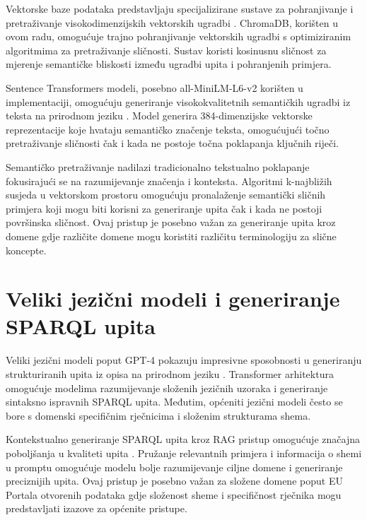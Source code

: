 Vektorske baze podataka predstavljaju specijalizirane sustave za pohranjivanje i pretraživanje visokodimenzijskih vektorskih ugradbi \cite{wang2023vector}. ChromaDB, korišten u ovom radu, omogućuje trajno pohranjivanje vektorskih ugradbi s optimiziranim algoritmima za pretraživanje sličnosti. Sustav koristi kosinusnu sličnost za mjerenje semantičke bliskosti između ugradbi upita i pohranjenih primjera.

Sentence Transformers modeli, posebno all-MiniLM-L6-v2 korišten u implementaciji, omogućuju generiranje visokokvalitetnih semantičkih ugradbi iz teksta na prirodnom jeziku \cite{reimers2019sentence}. Model generira 384-dimenzijske vektorske reprezentacije koje hvataju semantičko značenje teksta, omogućujući točno pretraživanje sličnosti čak i kada ne postoje točna poklapanja ključnih riječi.

Semantičko pretraživanje nadilazi tradicionalno tekstualno poklapanje fokusirajući se na razumijevanje značenja i konteksta. Algoritmi k-najbližih susjeda u vektorskom prostoru omogućuju pronalaženje semantički sličnih primjera koji mogu biti korisni za generiranje upita čak i kada ne postoji površinska sličnost. Ovaj pristup je posebno važan za generiranje upita kroz domene gdje različite domene mogu koristiti različitu terminologiju za slične koncepte.

\section{Veliki jezični modeli i generiranje SPARQL upita}
\label{sec:llm_sparql}

Veliki jezični modeli poput GPT-4 pokazuju impresivne sposobnosti u generiranju strukturiranih upita iz opisa na prirodnom jeziku \cite{brown2020language, devlin2018bert, emonet2024llm}. Transformer arhitektura omogućuje modelima razumijevanje složenih jezičnih uzoraka i generiranje sintaksno ispravnih SPARQL upita. Međutim, općeniti jezični modeli često se bore s domenski specifičnim rječnicima i složenim strukturama shema.

Kontekstualno generiranje SPARQL upita kroz RAG pristup omogućuje značajna poboljšanja u kvaliteti upita \cite{lewis2020retrieval}. Pružanje relevantnih primjera i informacija o shemi u promptu omogućuje modelu bolje razumijevanje ciljne domene i generiranje preciznijih upita. Ovaj pristup je posebno važan za složene domene poput EU Portala otvorenih podataka gdje složenost sheme i specifičnost rječnika mogu predstavljati izazove za općenite pristupe.

